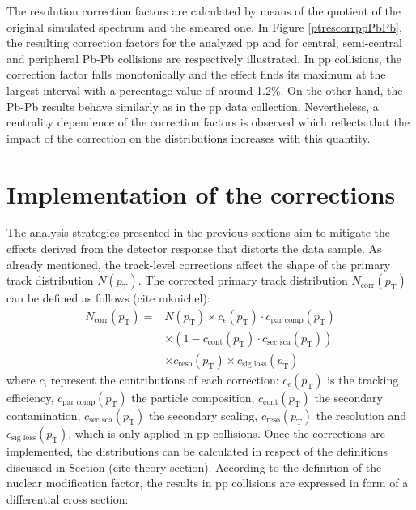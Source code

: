 \documentclass[12pt,a4paper]{report}
\begin{document}
The \pt resolution correction factors are calculated by means of the quotient of the original simulated \pt spectrum and the smeared one. In Figure \ref{ptrescorrppPbPb}, the resulting correction factors for the analyzed pp and for central, semi-central and peripheral Pb-Pb collisions are respectively illustrated. In pp collisions, the correction factor falls monotonically and the effect finds its maximum at the largest \pt interval with a percentage value of around 1.2\%. On the other hand, the Pb-Pb results behave similarly as in the pp data collection. Nevertheless, a centrality dependence of the correction factors is observed which reflects that the impact of the correction on the \pt distributions increases with this quantity.
\section{Implementation of the corrections}
\label{secCorr}
The analysis strategies presented in the previous sections aim to mitigate the effects derived from the detector response that distorts the data sample. As already mentioned, the track-level corrections affect the shape of the primary track distribution $N(p_\text{T})$. The corrected primary track distribution $N_\text{corr}(p_\text{T})$ can be defined as follows (cite mknichel):
\begin{equation}
\begin{split}
N_\text{corr}(p_\text{T}) = & N(p_\text{T}) \times c_\epsilon(p_\text{T}) \cdot c_\text{par comp}(p_\text{T})\\
& \times (1 - c_\text{cont}(p_\text{T}) \cdot c_\text{sec sca}(p_\text{T})) \\
&\times c_\text{reso}(p_\text{T}) \times c_\text{sig loss}(p_\text{T})
\end{split}
\end{equation}
where $c_\text{i}$ represent the contributions of each correction: $c_\epsilon(p_\text{T})$ is the tracking efficiency, $c_\text{par comp}(p_\text{T})$ the particle composition, $c_\text{cont}(p_\text{T})$ the secondary contamination, $c_\text{sec sca}(p_\text{T})$ the secondary scaling, $c_\text{reso}(p_\text{T})$ the \pt resolution and  $c_\text{sig loss}(p_\text{T})$, which is only applied in pp collisions. Once the corrections are implemented, the \pt distributions can be calculated in respect of the definitions discussed in Section (cite theory section).
According to the definition of the nuclear modification factor, the results in pp collisions are expressed in form of a differential cross section: 
\end{document}
